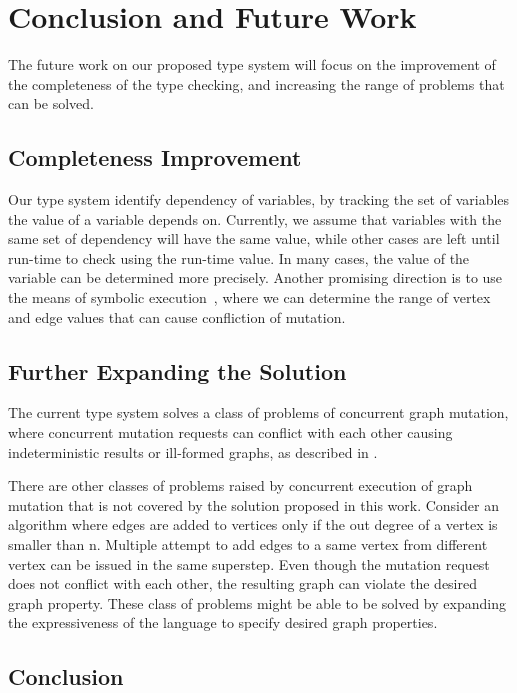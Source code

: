 \section{Conclusion and Future Work}
\label{sec:conclusion}

The future work on our proposed type system will focus on the improvement of the
completeness of the type checking, and increasing the range of problems that can
be solved.

\subsection{Completeness Improvement}
Our type system identify dependency of variables, by tracking the set of
variables the value of a variable depends on. Currently, we
assume that variables with the same set of dependency will have the same value,
while other cases are left until run-time to check using the run-time value. In
many cases, the value of the variable can be determined more precisely.
Another promising direction is to use the means of symbolic
execution~\cite{king1976}, where we can determine the range of vertex and edge
values that can cause confliction of mutation.

\subsection{Further Expanding the Solution}
The current type system solves a class of problems of concurrent graph mutation,
where concurrent mutation requests can conflict with each other causing
indeterministic results or ill-formed graphs, as described in . 

There are other classes of problems raised by concurrent execution of graph
mutation that is not covered by the solution proposed in this work. Consider an
algorithm where edges are added to vertices only if the out degree of a vertex
is smaller than n. Multiple attempt to add edges to a same vertex from
different vertex can be issued in the same superstep. Even though the mutation
request does not conflict with each other, the resulting graph can violate the
desired graph property. These class of problems might be able to be solved by
expanding the expressiveness of the language to specify desired graph
properties.

\subsection{Conclusion}
